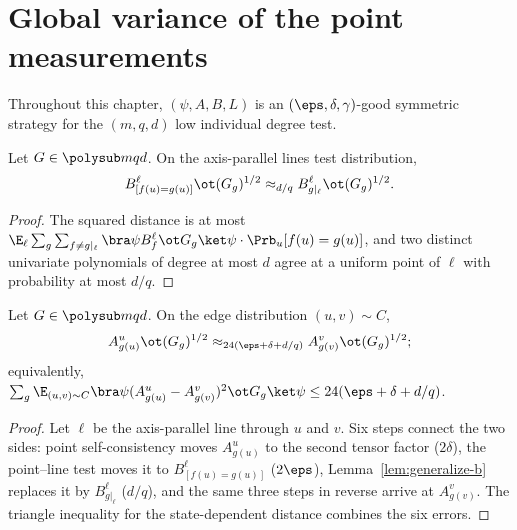 \chapter{Global variance of the point measurements}
\label{chap:variance}
\label{sec:variance}

Throughout this chapter, $(\psi,A,B,L)$ is an $(\eps,\delta,\gamma)$-good
symmetric strategy for the $(m,q,d)$ low individual degree test.

\begin{lemma}\label{lem:generalize-b}
	\leanok
	Let $G\in\polysub mqd$.  On the axis-parallel lines test distribution,
	\[
		B^\ell_{[f(u)=g(u)]}\ot(G_g)^{1/2}\approx_{d/q}B^\ell_{g|_\ell}\ot(G_g)^{1/2}.
	\]
\end{lemma}
\begin{proof}
	\leanok
	The squared distance is at most
	$\E_\ell\sum_g\sum_{f\ne g|_\ell}\bra\psi B^\ell_f\ot G_g\ket\psi\cdot
		\Prb_u[f(u)=g(u)]$, and two distinct univariate polynomials of degree at
	most $d$ agree at a uniform point of $\ell$ with probability at most $d/q$.
\end{proof}

\begin{lemma}\label{lem:local-variance-of-points}
	\leanok
	Let $G\in\polysub mqd$.  On the edge distribution $(u,v)\sim C$,
	\[
		A^u_{g(u)}\ot(G_g)^{1/2}\approx_{24(\eps+\delta+d/q)}A^v_{g(v)}\ot(G_g)^{1/2};
	\]
	equivalently,
	$\sum_g\E_{(u,v)\sim C}\bra\psi(A^u_{g(u)}-A^v_{g(v)})^2\ot G_g\ket\psi
		\le24(\eps+\delta+d/q)$.
\end{lemma}
\begin{proof}
	\leanok
	Let $\ell$ be the axis-parallel line through $u$ and $v$.  Six steps
	connect the two sides: point self-consistency moves $A^u_{g(u)}$ to the
	second tensor factor ($2\delta$), the point--line test moves it to
	$B^\ell_{[f(u)=g(u)]}$ ($2\eps$), Lemma~\ref{lem:generalize-b} replaces it
	by $B^\ell_{g|_\ell}$ ($d/q$), and the same three steps in reverse arrive at
	$A^v_{g(v)}$.  The triangle inequality for the state-dependent distance
	combines the six errors.
\end{proof}

